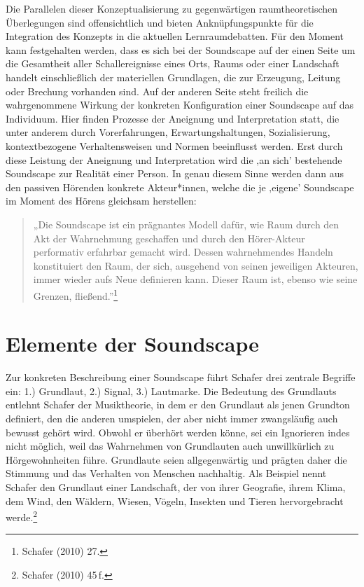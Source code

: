 \documentclass[a4paper,
fontsize=11pt,
oneside,
numbers=noperiodatend,
parskip=half-,
bibliography=totoc,
final
]{scrartcl}
\begin{document}
Die Parallelen dieser Konzeptualisierung zu gegenwärtigen
raumtheoretischen Überlegungen sind offensichtlich und bieten
Anknüpfungspunkte für die Integration des Konzepts in die aktuellen
Lernraumdebatten. Für den Moment kann festgehalten werden, dass es sich
bei der Soundscape auf der einen Seite um die Gesamtheit aller
Schallereignisse eines Orts, Raums oder einer Landschaft handelt
einschließlich der materiellen Grundlagen, die zur Erzeugung, Leitung
oder Brechung vorhanden sind. Auf der anderen Seite steht freilich die
wahrgenommene Wirkung der konkreten Konfiguration einer Soundscape auf
das Individuum. Hier finden Prozesse der Aneignung und Interpretation
statt, die unter anderem durch Vorerfahrungen, Erwartungshaltungen,
Sozialisierung, kontextbezogene Verhaltensweisen und Normen beeinflusst
werden. Erst durch diese Leistung der Aneignung und Interpretation wird
die ‚an sich' bestehende Soundscape zur Realität einer Person. In genau
diesem Sinne werden dann aus den passiven Hörenden konkrete
Akteur*innen, welche die je ‚eigene' Soundscape im Moment des Hörens
gleichsam herstellen:

\begin{quote}
„Die Soundscape ist ein prägnantes Modell dafür, wie Raum durch den Akt
der Wahrnehmung geschaffen und durch den Hörer-Akteur performativ
erfahrbar gemacht wird. Dessen wahrnehmendes Handeln konstituiert den
Raum, der sich, ausgehend von seinen jeweiligen Akteuren, immer wieder
aufs Neue definieren kann. Dieser Raum ist, ebenso wie seine Grenzen,
fließend.''\footnote{Schafer (2010) 27.}
\end{quote}

\hypertarget{elemente-der-soundscape}{%
\section{Elemente der Soundscape}\label{elemente-der-soundscape}}

Zur konkreten Beschreibung einer Soundscape führt Schafer drei zentrale
Begriffe ein: 1.) Grundlaut, 2.) Signal, 3.) Lautmarke. Die Bedeutung
des Grundlauts entlehnt Schafer der Musiktheorie, in dem er den
Grundlaut als jenen Grundton definiert, den die anderen umspielen, der
aber nicht immer zwangsläufig auch bewusst gehört wird. Obwohl er
überhört werden könne, sei ein Ignorieren indes nicht möglich, weil das
Wahrnehmen von Grundlauten auch unwillkürlich zu Hörgewohnheiten führe.
Grundlaute seien allgegenwärtig und prägten daher die Stimmung und das
Verhalten von Menschen nachhaltig. Als Beispiel nennt Schafer den
Grundlaut einer Landschaft, der von ihrer Geografie, ihrem Klima, dem
Wind, den Wäldern, Wiesen, Vögeln, Insekten und Tieren hervorgebracht
werde.\footnote{Schafer (2010) 45\,f.}
\end{document}

